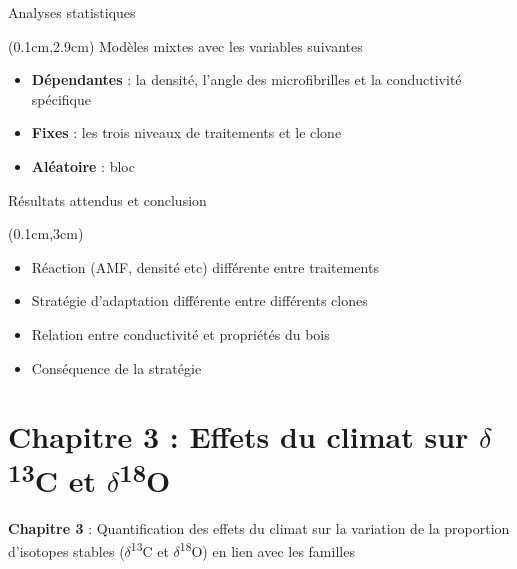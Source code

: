 \documentclass{beamer}
\begin{document}
\begin{frame}{Analyses statistiques}
	
	\begin{textblock*}{12cm}(0.1cm,2.9cm)
		Modèles mixtes avec les variables suivantes\\
		
		\begin{itemize} %
			\item \textbf{Dépendantes} : la densité, l’angle des microfibrilles et la conductivité spécifique \\
			\vspace{0.5cm}
			\item \textbf{Fixes} : les trois niveaux de traitements et le clone\\
			\vspace{0.5cm}
			\item \textbf{Aléatoire} : bloc\\			
		\end{itemize}
	\end{textblock*}
	
\end{frame}

\begin{frame}{Résultats attendus et conclusion}
	
	\begin{textblock*}{10cm}(0.1cm,3cm)
		\begin{itemize} %
			\item Réaction (AMF, densité etc) différente entre traitements \\
			\vspace{0.7cm}
			\item Stratégie d'adaptation différente entre différents clones  \\
			\vspace{0.7cm}
			\item Relation entre conductivité et propriétés du bois\\
			\vspace{0.7cm}
			\item Conséquence de la stratégie\\
		\end{itemize}
	\end{textblock*}
	
\end{frame}
\section{Chapitre 3 : Effets du climat sur $\delta$\textsuperscript{13}C et $\delta$\textsuperscript{18}O}
\begin{frame}%
\Large	\textbf{Chapitre 3} : Quantification des effets du climat	sur la variation de la proportion d’isotopes stables ($\delta$\textsuperscript{13}C et $\delta$\textsuperscript{18}O) en lien avec les familles\\
	
\end{frame}
\end{document}
